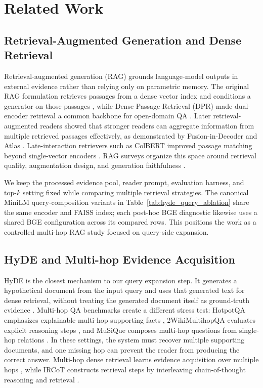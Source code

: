 \section{Related Work}
\label{sec:related_work}

\subsection{Retrieval-Augmented Generation and Dense Retrieval}
\label{sec:rw_rag_dense}

Retrieval-augmented generation (RAG) grounds language-model outputs in external evidence rather than relying only on parametric memory. The original RAG formulation retrieves passages from a dense vector index and conditions a generator on those passages \cite{lewis2020rag}, while Dense Passage Retrieval (DPR) made dual-encoder retrieval a common backbone for open-domain QA \cite{karpukhin2020dpr}. Later retrieval-augmented readers showed that stronger readers can aggregate information from multiple retrieved passages effectively, as demonstrated by Fusion-in-Decoder \cite{izacard2021fid} and Atlas \cite{izacard2023atlas}. Late-interaction retrievers such as ColBERT improved passage matching beyond single-vector encoders \cite{khattab2020colbert}. RAG surveys organize this space around retrieval quality, augmentation design, and generation faithfulness \cite{gao2023ragsurvey}.

We keep the processed evidence pool, reader prompt, evaluation harness, and top-$k$ setting fixed while comparing multiple retrieval strategies. The canonical MiniLM query-composition variants in Table~\ref{tab:hyde_query_ablation} share the same encoder and FAISS index; each post-hoc BGE diagnostic likewise uses a shared BGE configuration across its compared rows. This positions the work as a controlled multi-hop RAG study focused on query-side expansion.

\subsection{HyDE and Multi-hop Evidence Acquisition}
\label{sec:rw_hyde_multihop}

HyDE is the closest mechanism to our query expansion step. It generates a hypothetical document from the input query and uses that generated text for dense retrieval, without treating the generated document itself as ground-truth evidence \cite{gao2022hyde}. Multi-hop QA benchmarks create a different stress test: HotpotQA emphasizes explainable multi-hop supporting facts \cite{yang2018hotpotqa}, 2WikiMultihopQA evaluates explicit reasoning steps \cite{ho2020twowiki}, and MuSiQue composes multi-hop questions from single-hop relations \cite{trivedi2021musique}. In these settings, the system must recover multiple supporting documents, and one missing hop can prevent the reader from producing the correct answer. Multi-hop dense retrieval learns evidence acquisition over multiple hops \cite{xiong2021multihopdense}, while IRCoT constructs retrieval steps by interleaving chain-of-thought reasoning and retrieval \cite{trivedi2022ircot}.

